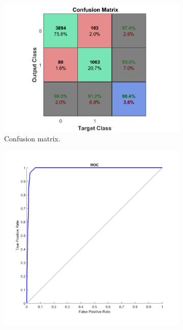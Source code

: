 \documentclass[a4paper, 11pt]{article}
\begin{document}
\begin{figure}[h]
    \centering
    \begin{subfigure}[t]{0.32\textwidth}
        \includegraphics[width=\textwidth]{../figures/final/confmat.png}
        \caption{Confusion matrix.}
        \label{fig:confmat}
    \end{subfigure}
    \hfill %
    \begin{subfigure}[t]{0.32\textwidth}
        \includegraphics[width=\textwidth]{../figures/final/roc.png}

\end{subfigure}
\end{figure}
\end{document}
